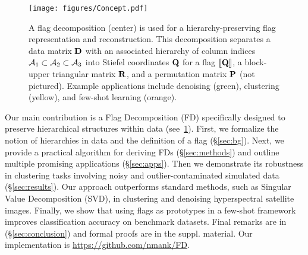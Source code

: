 \begin{figure}[t!]
    \centering
    \texttt{[image: figures/Concept.pdf]}
    \caption{A flag decomposition (center) is used for a hierarchy-preserving flag representation and reconstruction. This decomposition separates a data matrix $\mathbf{D}$ with an associated hierarchy of column indices $\mathcal{A}_1 \subset \mathcal{A}_2 \subset \mathcal{A}_3$ into Stiefel coordinates $\mathbf{Q}$ for a flag $[\![\mathbf{Q}]\!]$, a block-upper triangular matrix $\mathbf{R}$, and a permutation matrix $\mathbf{P}$ (not pictured). Example applications 
    include denoising (green), clustering (yellow), and few-shot learning (orange).\vspace{-3mm}}
    \label{fig:concept}
\end{figure}
Our main contribution is a Flag Decomposition (FD) specifically designed to preserve hierarchical structures within data (see~\cref{fig:concept}). First, we formalize the notion of hierarchies in data and the definition of a flag (\S\ref{sec:bg}). Next, we provide a practical algorithm for deriving FDs (\S\ref{sec:methods}) and outline multiple promising applications (\S\ref{sec:apps}). Then we demonstrate its robustness in clustering tasks involving noisy and outlier-contaminated simulated data (\S\ref{sec:results}). Our approach outperforms standard methods, such as Singular Value Decomposition (SVD), in clustering and denoising hyperspectral satellite images. Finally, we show that using flags as prototypes in a few-shot framework improves classification accuracy on benchmark datasets. Final remarks are in (\S\ref{sec:conclusion}) and formal proofs are in the suppl. material. Our implementation is \url{https://github.com/nmank/FD}.


